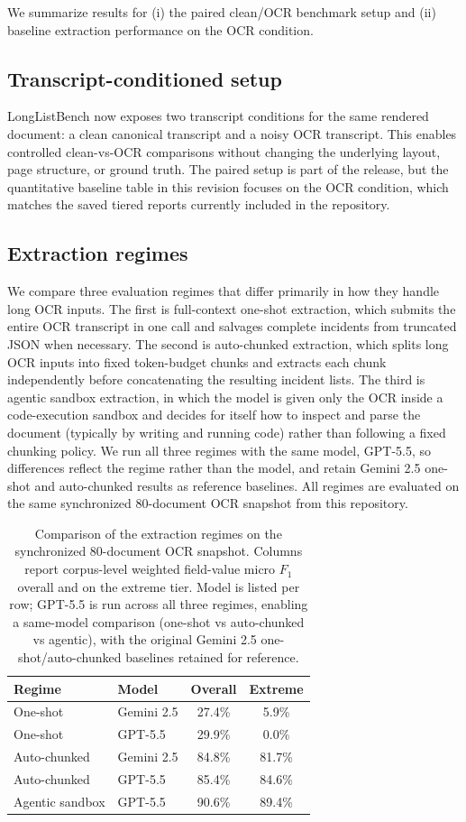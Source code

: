We summarize results for (i) the paired clean/OCR benchmark setup and (ii) baseline extraction performance on the OCR condition.

\subsection{Transcript-conditioned setup}
LongListBench now exposes two transcript conditions for the same rendered document: a clean canonical transcript and a noisy OCR transcript. This enables controlled clean-vs-OCR comparisons without changing the underlying layout, page structure, or ground truth. The paired setup is part of the release, but the quantitative baseline table in this revision focuses on the OCR condition, which matches the saved tiered reports currently included in the repository.

\subsection{Extraction regimes}
We compare three evaluation regimes that differ primarily in how they handle long OCR inputs. The first is full-context one-shot extraction, which submits the entire OCR transcript in one call and salvages complete incidents from truncated JSON when necessary. The second is auto-chunked extraction, which splits long OCR inputs into fixed token-budget chunks and extracts each chunk independently before concatenating the resulting incident lists. The third is agentic sandbox extraction, in which the model is given only the OCR inside a code-execution sandbox and decides for itself how to inspect and parse the document (typically by writing and running code) rather than following a fixed chunking policy. We run all three regimes with the same model, GPT-5.5, so differences reflect the regime rather than the model, and retain Gemini 2.5 one-shot and auto-chunked results as reference baselines. All regimes are evaluated on the same synchronized 80-document OCR snapshot from this repository.

\begin{table}[t]
\centering
\small
\caption{Comparison of the extraction regimes on the synchronized 80-document OCR snapshot. Columns report corpus-level weighted field-value micro $F_1$ overall and on the extreme tier. Model is listed per row; GPT-5.5 is run across all three regimes, enabling a same-model comparison (one-shot vs auto-chunked vs agentic), with the original Gemini 2.5 one-shot/auto-chunked baselines retained for reference.}
\label{tab:two-regimes}
\begin{tabular}{@{}llcc@{}}
\toprule
Regime & Model & Overall & Extreme \\
\midrule
One-shot & Gemini 2.5 & 27.4\% & 5.9\% \\
One-shot & GPT-5.5 & 29.9\% & 0.0\% \\
Auto-chunked & Gemini 2.5 & 84.8\% & 81.7\% \\
Auto-chunked & GPT-5.5 & 85.4\% & 84.6\% \\
Agentic sandbox & GPT-5.5 & 90.6\% & 89.4\% \\
\bottomrule
\end{tabular}
\end{table}

